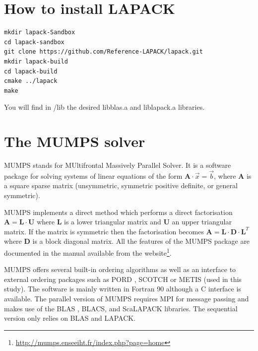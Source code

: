 \section{How to install LAPACK}

\begin{verbatim}
mkdir lapack-Sandbox 
cd lapack-sandbox
git clone https://github.com/Reference-LAPACK/lapack.git
mkdir lapack-build
cd lapack-build
cmake ../lapack
make
\end{verbatim}
You will find in /lib the desired libblas.a and liblapack.a libraries.


\section{The MUMPS solver}

MUMPS stands for MUltifrontal Massively Parallel Solver. It is a software package 
for solving systems of linear equations of the 
form ${\bm A}\cdot{\vec x} = {\vec b}$, where ${\bm A}$ is a square sparse matrix (unsymmetric, 
symmetric positive definite, or general symmetric). 

MUMPS implements a direct method which performs a direct factorisation
${\bm A} = {\bm L}\cdot{\bm U}$ where ${\bm L}$ is a lower triangular matrix and ${\bm U}$ 
an upper triangular matrix. If the matrix is symmetric then the factorisation becomes
${\bm A} = {\bm L}\cdot{\bm D}\cdot{\bm L}^T$
where ${\bm D}$ is a block diagonal matrix. 
All the features of the MUMPS package are documented in the manual available from the 
website\footnote{\url{http://mumps.enseeiht.fr/index.php?page=home}}.


MUMPS offers several built-in ordering algorithms as well as an 
interface to external ordering packages such as PORD \cite{schu01}, SCOTCH \cite{pell07} 
or METIS \cite{kaku98} (used in this study). 
The software is mainly written in Fortran 90 although a C interface is available. 
The parallel version of MUMPS requires 
MPI \cite{snoh96} for message passing and makes use of the BLAS \cite{dodd90a,dodd90b}, BLACS, and ScaLAPACK
\cite{blcc97} libraries. 
The sequential version only relies on BLAS and LAPACK.

